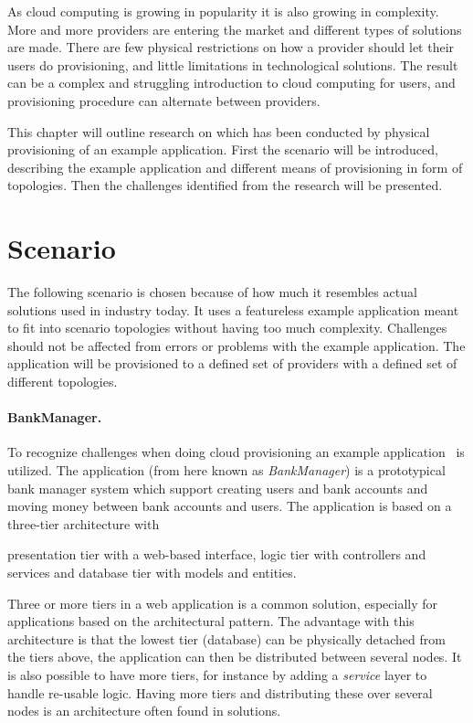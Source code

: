 
As cloud computing is growing in popularity it is also growing in complexity.
More and more providers are entering the market and different types of solutions are made.
There are few physical restrictions on how a provider should let their users do provisioning,
and little limitations in technological solutions.
The result can be a complex and struggling introduction to cloud computing for users,
and provisioning procedure can alternate between providers.

This chapter will outline research on which has been conducted by
physical provisioning of an example application.
First the scenario will be introduced, describing the example application
and different means of provisioning in form of topologies.
Then the challenges identified from the research will be presented.

\section{Scenario}

The following scenario is chosen because of how much it resembles actual solutions
used in industry today.
It uses a featureless example application meant to fit into scenario topologies
without having too much complexity.
Challenges should not be affected from errors or problems with the example application.
The application will be provisioned to a defined set of providers with a defined set of different topologies.

\paragraph{BankManager.}

To recognize challenges when doing cloud provisioning an example application~\cite{BankManager} is utilized.
The application (from here known as \emph{BankManager}) is a prototypical bank manager system
which support creating users and bank accounts and moving money between bank accounts and users.
The application is based on a three-tier architecture with 
\begin{ii} 
  \iitem presentation tier with a web-based interface,
  \iitem logic tier with controllers and services and
  \iitem database tier with models and entities. \end{ii}Three 
or more tiers in a web application is a common solution, especially for applications 
based on the  architectural pattern.
The advantage with this architecture is that the lowest tier (database) can be physically
detached from the tiers above, the application can then be distributed between several nodes.
It is also possible to have more tiers, for instance by adding a \emph{service} 
layer to handle re-usable logic.
Having more tiers and distributing these over several nodes is an architecture often
found in  solutions.

